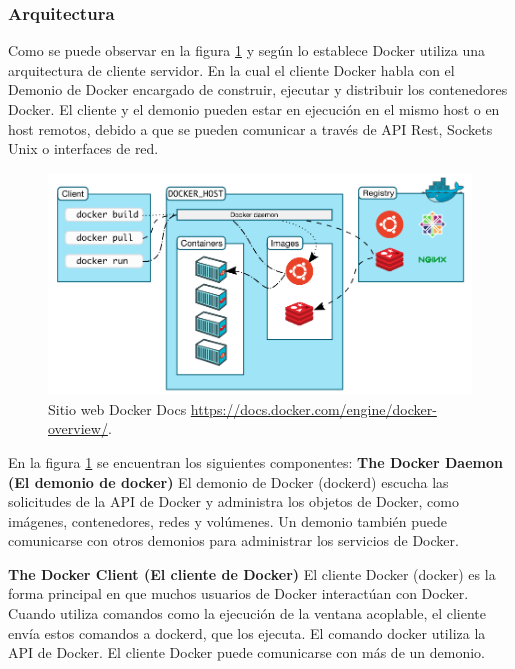 \subsubsection{Arquitectura}

Como se puede observar en la figura \ref{fig:DockerArquitectura} y según lo establece \textcite{Docker2018} Docker utiliza una arquitectura de cliente servidor. En la cual el cliente Docker habla con el Demonio de Docker encargado de construir, ejecutar y distribuir los contenedores Docker. El cliente y el demonio pueden estar en ejecución en el mismo host o en host remotos, debido a que se pueden comunicar a través de API Rest, Sockets Unix o interfaces de red.

\begin{figure}[!hbtp]
	\centering
	\includegraphics[width=\linewidth]{Trabajo/RecursosEducativos/RE05_Docker/REDocker_Arquitectura.png}
	\vspace{-0.2cm}
	\caption{Sitio web Docker Docs \url{https://docs.docker.com/engine/docker-overview/}.}
	\label{fig:DockerArquitectura}
\end{figure}

En la figura \ref{fig:DockerArquitectura} se encuentran los siguientes componentes:
\textbf{The Docker Daemon (El demonio de docker)}
El demonio de Docker (dockerd) escucha las solicitudes de la API de Docker y administra los objetos de Docker, como imágenes, contenedores, redes y volúmenes. Un demonio también puede comunicarse con otros demonios para administrar los servicios de Docker. \parencite{Docker2018}

\textbf{The Docker Client (El cliente de Docker)}
El cliente Docker (docker) es la forma principal en que muchos usuarios de Docker interactúan con Docker. Cuando utiliza comandos como la ejecución de la ventana acoplable, el cliente envía estos comandos a dockerd, que los ejecuta. El comando docker utiliza la API de Docker. El cliente Docker puede comunicarse con más de un demonio.\parencite{Docker2018}

